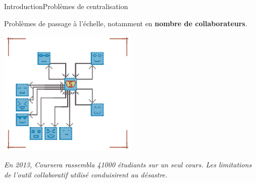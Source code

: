 \begin{frame}{Introduction}{Problèmes de centralisation}
  

  Problèmes de passage à l'échelle, notamment en \textbf{nombre de
    collaborateurs}.
  
  \vspace{0.5cm}
  
  \begin{center}
    \includegraphics[width=0.5\textwidth]{img/centralizedcpuproblems.png}
  \end{center}
  
  \vspace{0.25cm}

  \textit{En 2013, Coursera rassembla 41000 étudiants sur un seul cours.  Les
    limitations de l'outil collaboratif utilisé conduisirent au \og
    désastre\fg{}.}

  \vspace{0.25cm}




\end{frame}

